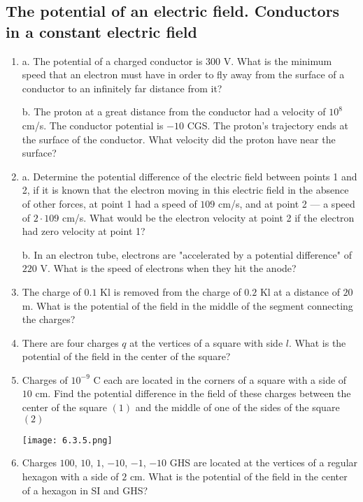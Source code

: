 \documentclass{article}
\begin{document}
\subsection{The potential of an electric field. Conductors in a constant electric field}
\begin{enumerate}[label=6.3.\arabic*]

\item a. The potential of a charged conductor is $300$ V. What is the minimum speed that an electron must have in order to fly away from the surface of a conductor to an infinitely far distance from it? 

b. The proton at a great distance from the conductor had a velocity of $10^8$ cm/s. The conductor potential is $-10$ CGS. The proton's trajectory ends at the surface of the conductor. What velocity did the proton have near the surface?

\item a. Determine the potential difference of the electric field between points 1 and 2, if it is known that the electron moving in this electric field in the absence of other forces, at point 1 had a speed of $109$ cm/s, and at point 2 — a speed of $2 \cdot 109$ cm/s. What would be the electron velocity at point 2 if the electron had zero velocity at point 1? 

b. In an electron tube, electrons are "accelerated by a potential difference" of $220$ V. What is the speed of electrons when they hit the anode?

\item The charge of $0.1$ Kl is removed from the charge of $0.2$ Kl at a distance of $20$ m. What is the potential of the field in the middle of the segment connecting the charges?

\item There are four charges $q$ at the vertices of a square with side $l$. What is the potential of the field in the center of the square?

\item Charges of $10^{-9}$ C each are located in the corners of a square with a side of $10$ cm. Find the potential difference in the field of these charges between the center of the square $(1)$ and the middle of one of the sides of the square $(2)$

\begin{center}
    \texttt{[image: 6.3.5.png]}
\end{center}

\item Charges $100$, $10$, $1$, $-10$, $-1$, $-10$ GHS are located at the vertices of a regular hexagon with a side of $2$ cm. What is the potential of the field in the center of a hexagon in SI and GHS?


\end{enumerate}
\end{document}
